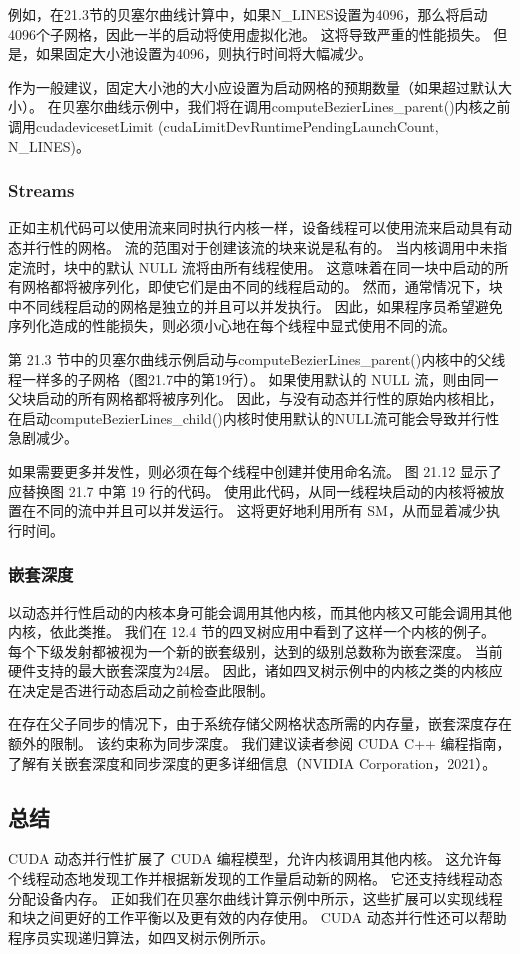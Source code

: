 例如，在21.3节的贝塞尔曲线计算中，如果N\_LINES设置为4096，那么将启动4096个子网格，因此一半的启动将使用虚拟化池。 
这将导致严重的性能损失。 但是，如果固定大小池设置为4096，则执行时间将大幅减少。

作为一般建议，固定大小池的大小应设置为启动网格的预期数量（如果超过默认大小）。 
在贝塞尔曲线示例中，我们将在调用computeBezierLines\_parent()内核之前调用cudadevicesetLimit (cudaLimitDevRuntimePendingLaunchCount, N\_LINES)。

\subsubsection{Streams}
正如主机代码可以使用流来同时执行内核一样，设备线程可以使用流来启动具有动态并行性的网格。 
流的范围对于创建该流的块来说是私有的。 当内核调用中未指定流时，块中的默认 NULL 流将由所有线程使用。 
这意味着在同一块中启动的所有网格都将被序列化，即使它们是由不同的线程启动的。 
然而，通常情况下，块中不同线程启动的网格是独立的并且可以并发执行。 
因此，如果程序员希望避免序列化造成的性能损失，则必须小心地在每个线程中显式使用不同的流。

第 21.3 节中的贝塞尔曲线示例启动与computeBezierLines\_parent()内核中的父线程一样多的子网格（图21.7中的第19行）。 
如果使用默认的 NULL 流，则由同一父块启动的所有网格都将被序列化。 
因此，与没有动态并行性的原始内核相比，在启动computeBezierLines\_child()内核时使用默认的NULL流可能会导致并行性急剧减少。

如果需要更多并发性，则必须在每个线程中创建并使用命名流。 图 21.12 显示了应替换图 21.7 中第 19 行的代码。 
使用此代码，从同一线程块启动的内核将被放置在不同的流中并且可以并发运行。 这将更好地利用所有 SM，从而显着减少执行时间。

\subsubsection{嵌套深度}
以动态并行性启动的内核本身可能会调用其他内核，而其他内核又可能会调用其他内核，依此类推。 
我们在 12.4 节的四叉树应用中看到了这样一个内核的例子。 每个下级发射都被视为一个新的嵌套级别，达到的级别总数称为嵌套深度。 
当前硬件支持的最大嵌套深度为24层。 因此，诸如四叉树示例中的内核之类的内核应在决定是否进行动态启动之前检查此限制。

在存在父子同步的情况下，由于系统存储父网格状态所需的内存量，嵌套深度存在额外的限制。 该约束称为同步深度。 
我们建议读者参阅 CUDA C++ 编程指南，了解有关嵌套深度和同步深度的更多详细信息（NVIDIA Corporation，2021）。

\subsection{总结}
CUDA 动态并行性扩展了 CUDA 编程模型，允许内核调用其他内核。 这允许每个线程动态地发现工作并根据新发现的工作量启动新的网格。 
它还支持线程动态分配设备内存。 
正如我们在贝塞尔曲线计算示例中所示，这些扩展可以实现线程和块之间更好的工作平衡以及更有效的内存使用。 
CUDA 动态并行性还可以帮助程序员实现递归算法，如四叉树示例所示。

